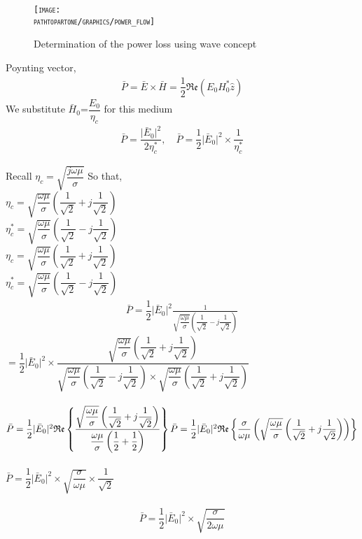 \begin{figure}
\centering
\textsc{\texttt{[image: \\pathtopartone/graphics/power\_flow]}}
\caption{Determination of the power loss using wave concept}
\end{figure}

Poynting vector,
\begin{align}
\bar{P}=\bar{E}\times \bar{H}=\dfrac{1}{2}\mathfrak{Re}(E_{0}H_{0}^{\ast}\hat{z})
\end{align} 
We substitute $\bar{H}$$_{0}$=$\dfrac{E_{0}}{\eta_{c}}$ for this medium
\begin{align}
\bar{P}=\dfrac{\lvert\bar{E}_{0}\rvert^{2}}{2\eta_{c}^{\ast}},\quad
\bar{P}=\dfrac{1}{2}\lvert\bar{E}_{0}\rvert^{2}\times \dfrac{1}{\eta_{c}^{\ast}}
\end{align}

Recall  $\eta_{c}=\sqrt{\dfrac{j\omega\mu}{\sigma}}$
So that,\\
$\eta_{c}=\sqrt{\dfrac{\omega\mu}{\sigma}}(\dfrac{1}{\sqrt{2}}+j\dfrac{1}{\sqrt{2}})$\\
$\eta_{c}^{\ast}=\sqrt{\dfrac{\omega\mu}{\sigma}}(\dfrac{1}{\sqrt{2}}-j\dfrac{1}{\sqrt{2}})$\\

$\eta_{c}=\sqrt{\dfrac{\omega\mu}{\sigma}}(\dfrac{1}{\sqrt{2}}+j\dfrac{1}{\sqrt{2}})$\\
$\eta_{c}^{\ast}=\sqrt{\dfrac{\omega\mu}{\sigma}}(\dfrac{1}{\sqrt{2}}-j\dfrac{1}{\sqrt{2}})$\\
\begin{align}
\bar{P}=\dfrac{1}{2}\lvert\bar{E}_{0}\rvert^{2}{\frac{1}{\sqrt{\dfrac{\omega\mu}{\sigma}}(\dfrac{1}{\sqrt{2}}-j\dfrac{1}{\sqrt{2}})}} 
\end{align}
$=\dfrac{1}{2}\lvert\bar{E}_{0}\rvert^{2}\times \dfrac{\sqrt{\dfrac{\omega\mu}{\sigma}}(\dfrac{1}{\sqrt{2}}+j\dfrac{1}{\sqrt{2}})}{\sqrt{\dfrac{\omega\mu}{\sigma}}(\dfrac{1}{\sqrt{2}}-j\dfrac{1}{\sqrt{2}})\times \sqrt{\dfrac{\omega\mu}{\sigma}}(\dfrac{1}{\sqrt{2}}+j\dfrac{1}{\sqrt{2}})}$\\\\
$\bar{P}=\dfrac{1}{2}\lvert\bar{E}_{0}\rvert^{2}\mathfrak{Re}\left\lbrace\dfrac{\sqrt{\dfrac{\omega\mu}{\sigma}}\left(\dfrac{1}{\sqrt{2}}+j\dfrac{1}{\sqrt{2}}\right)}{\dfrac{\omega\mu}{\sigma}\left(\dfrac{1}{2}+\dfrac{1}{2}\right)}\right\rbrace\\\\
\bar{P}=\dfrac{1}{2}\lvert\bar{E}_{0}\rvert^{2}\mathfrak{Re}\left\lbrace\dfrac{\sigma}{\omega\mu}\left(\sqrt{\dfrac{\omega\mu}{\sigma}}\left(\dfrac{1}{\sqrt{2}}+j\dfrac{1}{\sqrt{2}}\right)\right)\right\rbrace$\\\\
$\bar{P}=\dfrac{1}{2}\lvert\bar{E}_{0}\rvert^{2}\times \sqrt{\dfrac{\sigma}{\omega\mu}}\times \dfrac{1}{\sqrt{2}}$\\\\
\begin{equation}
\bar{P}=\dfrac{1}{2}\lvert\bar{E}_{0}\rvert^{2}\times \sqrt{\dfrac{\sigma}{2\omega\mu}}
\end{equation}

